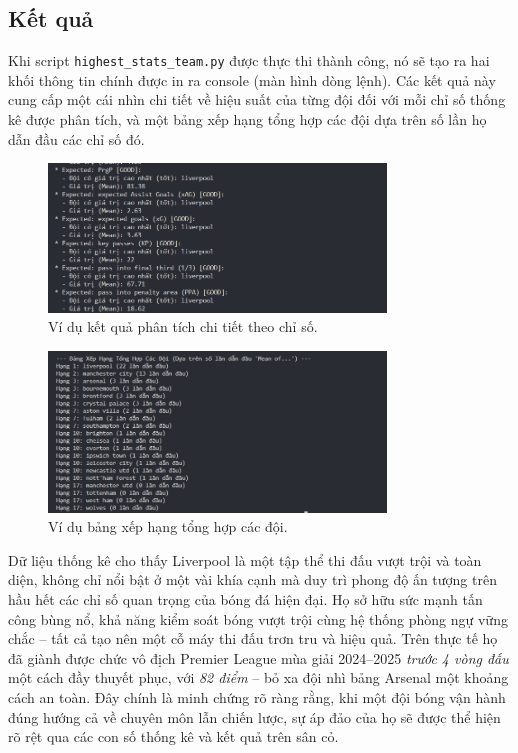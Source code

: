 \documentclass[12pt, a4paper]{report}
\begin{document}
\subsection{Kết quả}
Khi script \texttt{highest\_stats\_team.py} được thực thi thành công, nó sẽ tạo ra hai khối thông tin chính được in ra console (màn hình dòng lệnh).
Các kết quả này cung cấp một cái nhìn chi tiết về hiệu suất của từng đội đối với mỗi chỉ số thống kê được phân tích, và một bảng xếp hạng tổng hợp các đội dựa trên số lần họ dẫn đầu các chỉ số đó.

\begin{figure}[H]
    \centering
    \includegraphics[width=0.8\textwidth]{output_2.4.1.png}
    \caption{Ví dụ kết quả phân tích chi tiết theo chỉ số.}
    \label{fig:analysis_output1}
\end{figure}

\begin{figure}[H]
    \centering
    \includegraphics[width=0.8\textwidth]{output_2.4.2.png}
    \caption{Ví dụ bảng xếp hạng tổng hợp các đội.}
    \label{fig:overall_ranking}
\end{figure}

Dữ liệu thống kê cho thấy Liverpool là một tập thể thi đấu vượt trội và toàn diện, không chỉ nổi bật ở một vài khía cạnh mà duy trì phong độ ấn tượng trên hầu hết các chỉ số quan trọng của bóng đá hiện đại.
Họ sở hữu sức mạnh tấn công bùng nổ, khả năng kiểm soát bóng vượt trội cùng hệ thống phòng ngự vững chắc – tất cả tạo nên một cỗ máy thi đấu trơn tru và hiệu quả.
Trên thực tế họ đã giành được chức vô địch Premier League mùa giải 2024–2025 \textit{trước 4 vòng đấu} một cách đầy thuyết phục, với \textit{82 điểm} – bỏ xa đội nhì bảng Arsenal một khoảng cách an toàn.
Đây chính là minh chứng rõ ràng rằng, khi một đội bóng vận hành đúng hướng cả về chuyên môn lẫn chiến lược, sự áp đảo của họ sẽ được thể hiện rõ rệt qua các con số thống kê và kết quả trên sân cỏ.
\end{document}
